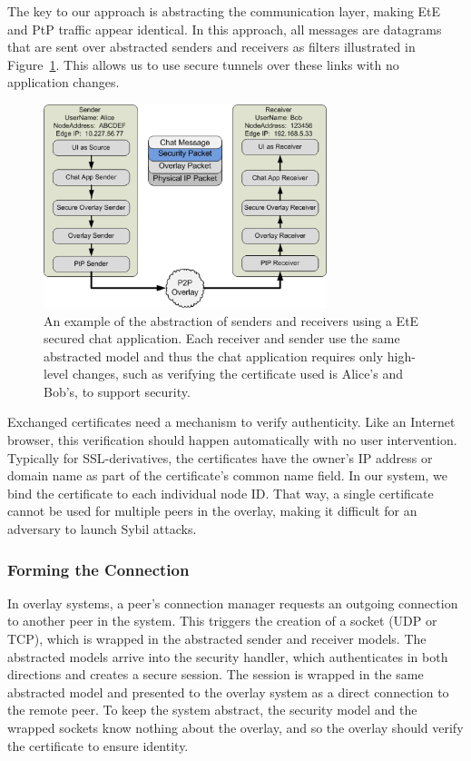 \documentclass[conference]{IEEEtran}
\begin{document}
The key to our approach is abstracting the communication layer, making EtE and
PtP traffic appear identical. In this approach, all messages are datagrams that are sent
over abstracted senders and receivers as filters illustrated in
Figure~\ref{fig:senders_receivers}.  This allows us to use secure tunnels over
these links with no application changes.

\begin{figure}[h]
\centering
\includegraphics[width=3.25in]{secure_sender_stack_generic.png.eps}
\caption{An example of the abstraction of senders and receivers using a EtE 
secured chat application.  Each receiver and sender use the same abstracted
model and thus the chat application requires only high-level changes, such
as verifying the certificate used is Alice's and Bob's, to support security.}
\label{fig:senders_receivers}
\end{figure}

Exchanged certificates need a mechanism to verify authenticity.  Like an
Internet browser, this verification should happen automatically with no user
intervention.  Typically for SSL-derivatives, the certificates have the owner's
IP address or domain name as part of the certificate's common name field.  In
our system, we bind the certificate to each individual node ID.  That way,
a single certificate cannot be used for multiple peers in the overlay, making
it difficult for an adversary to launch Sybil attacks.

\subsubsection{Forming the Connection}
In overlay systems, a peer's connection manager requests an outgoing
connection to another peer in the system.  This triggers the creation of a
socket (UDP or TCP), which is wrapped in the abstracted sender and receiver
models.  The abstracted models arrive into the security handler, which
authenticates in both directions and creates a secure session.  The session is
wrapped in the same abstracted model and presented to the overlay system as a
direct connection to the remote peer.  To keep the system abstract, the security
model and the wrapped sockets know nothing about the overlay, and so the overlay
should verify the certificate to ensure identity.
\end{document}
